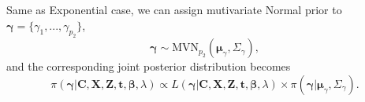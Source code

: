 \documentclass[a4paper, 12pt]{article}
\begin{document}
Same as Exponential case, we can assign mutivariate Normal prior to $\mathbf{\gamma}=\{\gamma_1,...,\gamma_{p_2}\}$,
\begin{equation}
\mathbf{\gamma} \sim \mbox{MVN}_{p_2}(\mathbf{\mu}_{\gamma}, \Sigma_{\gamma}),
\end{equation}
and the corresponding joint posterior distribution becomes 
\begin{equation}
\pi(\mathbf{\gamma}|\mathbf{C}, \mathbf{X}, \mathbf{Z}, \mathbf{t}, \mathbf{\beta}, \lambda) \propto L(\mathbf{\gamma}|\mathbf{C}, \mathbf{X}, \mathbf{Z}, \mathbf{t}, \mathbf{\beta}, \lambda)\times \pi(\mathbf{\gamma}|\mathbf{\mu}_{\gamma}, \Sigma_{\gamma}).
\end{equation}
\end{document}
